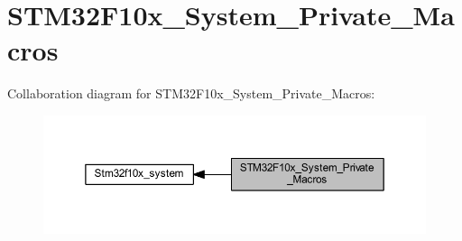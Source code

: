 \hypertarget{group___s_t_m32_f10x___system___private___macros}{}\section{S\+T\+M32\+F10x\+\_\+\+System\+\_\+\+Private\+\_\+\+Macros}
\label{group___s_t_m32_f10x___system___private___macros}
Collaboration diagram for S\+T\+M32\+F10x\+\_\+\+System\+\_\+\+Private\+\_\+\+Macros\+:
\nopagebreak
\begin{figure}[H]
\begin{center}
\leavevmode
\includegraphics[width=350pt]{group___s_t_m32_f10x___system___private___macros}
\end{center}
\end{figure}
